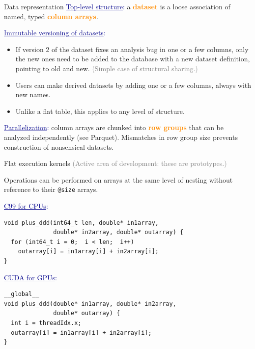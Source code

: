 \documentclass{beamer}
\begin{document}
\begin{frame}[fragile]{Data representation}
\vspace{0.35 cm}
\textcolor{darkblue}{\underline{Top-level structure}:} a \textcolor{darkorange}{\bf dataset} is a loose association of named, typed \textcolor{darkorange}{\bf column arrays}.

\vspace{0.3 cm}
\textcolor{darkblue}{\underline{Immutable versioning of datasets}:}
\begin{itemize}\setlength{\itemsep}{0.2 cm}
\item If version 2 of the dataset fixes an analysis bug in one or a few columns, only the new ones need to be added to the database with a new dataset definition, pointing to old and new. \textcolor{gray}{(Simple case of structural sharing.)}
\item Users can make derived datasets by adding one or a few columns, always with new names.
\item Unlike a flat table, this applies to any level of structure.
\end{itemize}

\vspace{0.3 cm}
\textcolor{darkblue}{\underline{Parallelization}:} column arrays are chunked into \textcolor{darkorange}{\bf row groups} that can be analyzed independently (see Parquet). Mismatches in row group size prevents construction of nonsensical datasets.
\end{frame}

\begin{frame}[fragile]{Flat execution kernels}
\vspace{0.5 cm}
\textcolor{gray}{(Active area of development: these are prototypes.)}
\small

\vspace{0.25 cm}
Operations can be performed on arrays at the same level of nesting without reference to their {\tt @size} arrays.

\vspace{0.25 cm}
\textcolor{darkblue}{\normalsize \underline{C99 for CPUs}:}
\vspace{-0.1 cm}
\begin{verbatim}
void plus_ddd(int64_t len, double* in1array,
              double* in2array, double* outarray) {
  for (int64_t i = 0;  i < len;  i++)
    outarray[i] = in1array[i] + in2array[i];
}
\end{verbatim}

\vspace{0.25 cm}
\textcolor{darkblue}{\normalsize \underline{CUDA for GPUs}:}
\vspace{-0.1 cm}
\begin{verbatim}
__global__
void plus_ddd(double* in1array, double* in2array,
              double* outarray) {
  int i = threadIdx.x;
  outarray[i] = in1array[i] + in2array[i];
}
\end{verbatim}
\end{frame}
\end{document}
